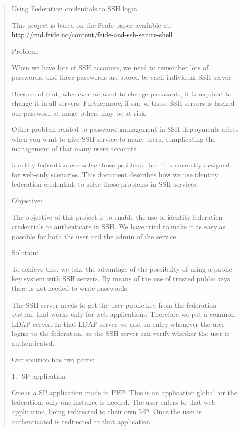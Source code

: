 \begin{quote}

Using Federation credentials to SSH login

This project is based on the Feide paper available at:
\url{http://rnd.feide.no/content/feide-and-ssh-secure-shell}

Problem:

    When we have lots of SSH accounts, we need to remember lots of
    passwords, and these passwords are stored by each individual SSH
    server.

    Because of that, whenever we want to change passwords, it is required
    to change it in all servers.  Furthermore, if one of those SSH servers
    is hacked our password at many others may be at risk.

    Other problem related to password management in SSH deployments
    arises when you want to give SSH service to many users, complicating
    the management of that many users accounts. 

    Identity federation can solve those problems, but it is currently
    designed for web-only scenarios. This document describes how we use
    identity federation credentials to solve those problems in SSH services.

Objective:

    The objective of this project is to enable the use of identity
    federation credentials to authenticate in SSH. We have tried to make it
    as easy as possible for both the user and the admin of the service.


Solution:

    To achieve this, we take the advantage of the possibility of using
    a public key system with SSH servers. By means of the use of trusted
    public keys there is not needed to write passwords.

    The SSH server needs to get the user public key from the federation
    system, that works only for web applications. Therefore we put a
    common LDAP server. In that LDAP server we add an entry whenever the
    user logins to the federation, so the SSH server can verify whether
    the user is authenticated.

    Our solution has two parts:
    
    1.- SP application

    One is a SP application made in PHP.  This is an application global
    for the federation; only one instance is needed. The user enters
    to that web application, being redirected to their own IdP. Once
    the user is authenticated is redirected to that application.


\end{quote}
